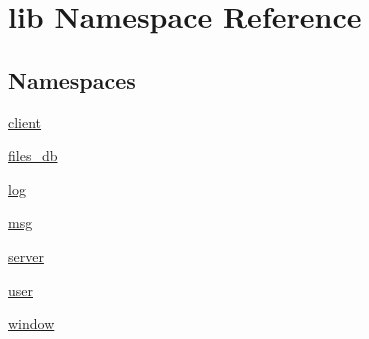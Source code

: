 \hypertarget{namespacelib}{}\section{lib Namespace Reference}
\label{namespacelib}
\subsection*{Namespaces}
\begin{DoxyCompactItemize}
\item 
 \hyperlink{namespacelib_1_1client}{client}
\item 
 \hyperlink{namespacelib_1_1files__db}{files\+\_\+db}
\item 
 \hyperlink{namespacelib_1_1log}{log}
\item 
 \hyperlink{namespacelib_1_1msg}{msg}
\item 
 \hyperlink{namespacelib_1_1server}{server}
\item 
 \hyperlink{namespacelib_1_1user}{user}
\item 
 \hyperlink{namespacelib_1_1window}{window}
\end{DoxyCompactItemize}
